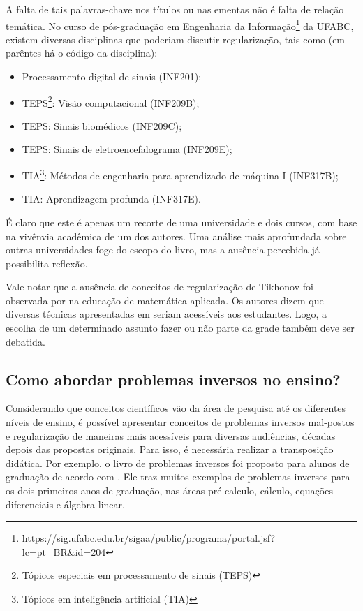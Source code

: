 A falta de tais palavras-chave nos títulos ou nas ementas não é falta de relação temática. No curso de pós-graduação em Engenharia da Informação\footnote{\url{https://sig.ufabc.edu.br/sigaa/public/programa/portal.jsf?lc=pt_BR\&id=204}} da UFABC, existem diversas disciplinas que poderiam discutir regularização, tais como (em parêntes há o código da disciplina): 
\begin{itemize}
    \item Processamento digital de sinais (INF201); 
    \item TEPS\footnote{Tópicos especiais em processamento de sinais (TEPS)}: Visão computacional (INF209B);
    \item TEPS: Sinais biomédicos (INF209C); 
    \item TEPS: Sinais  de eletroencefalograma  (INF209E);
    \item  TIA\footnote{Tópicos em inteligência artificial (TIA)}: Métodos de engenharia para aprendizado de máquina I (INF317B);
    \item TIA: Aprendizagem profunda (INF317E).
\end{itemize} 
É claro que este é apenas um recorte de uma universidade e dois cursos, com base na vivênvia acadêmica de um dos autores. Uma análise mais aprofundada sobre outras universidades foge do escopo do livro, mas a ausência percebida já possibilita reflexão.

Vale notar que a ausência de conceitos de regularização de Tikhonov foi observada por \cite{Bell1978} na educação de matemática aplicada. Os autores dizem que diversas técnicas apresentadas em \cite{tikhonov1977solutions} seriam acessíveis aos estudantes. Logo, a escolha de um determinado assunto fazer ou não parte da grade também deve ser debatida.

\subsection{Como abordar problemas inversos no ensino?}
Considerando que conceitos científicos vão da área de pesquisa até os diferentes níveis de ensino, é possível apresentar conceitos de problemas inversos mal-postos e regularização de maneiras mais acessíveis para diversas audiências, décadas depois das propostas originais. Para isso, é necessária realizar a transposição didática. Por exemplo, o livro \cite{groetsch1999inverse} de problemas inversos foi proposto para alunos de graduação de acordo com \cite{Yamamoto2003}. Ele traz muitos exemplos de problemas inversos para os dois primeiros anos de graduação, nas áreas pré-calculo, cálculo, equações diferenciais e álgebra linear. 


